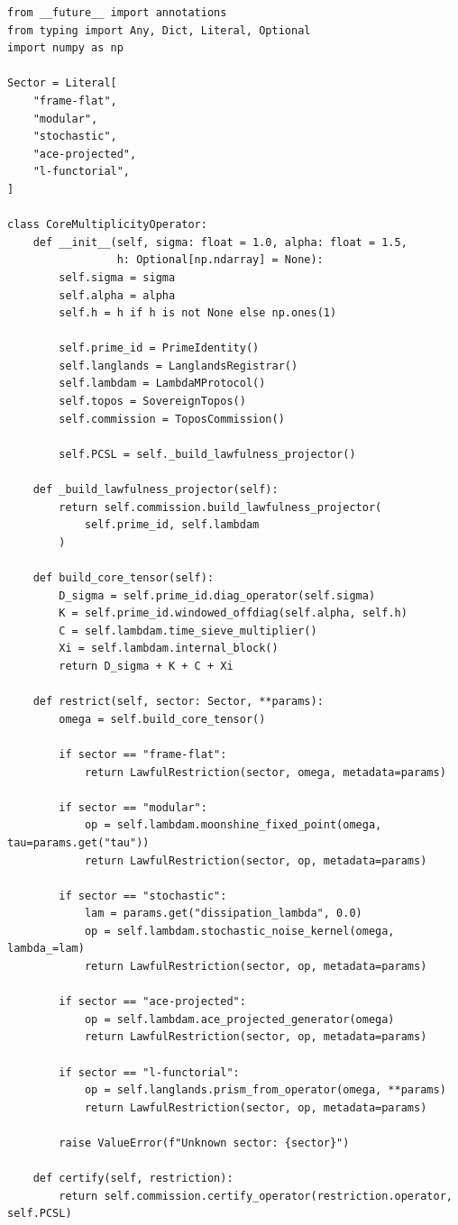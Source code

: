 \documentclass[11pt]{article}
\theoremstyle{plain}
\theoremstyle{definition}
\theoremstyle{remark}
\begin{document}
\begin{lstlisting}[style=pythonstyle,caption={Core Multiplicity Operator skeleton}]
from __future__ import annotations
from typing import Any, Dict, Literal, Optional
import numpy as np

Sector = Literal[
    "frame-flat",
    "modular",
    "stochastic",
    "ace-projected",
    "l-functorial",
]

class CoreMultiplicityOperator:
    def __init__(self, sigma: float = 1.0, alpha: float = 1.5,
                 h: Optional[np.ndarray] = None):
        self.sigma = sigma
        self.alpha = alpha
        self.h = h if h is not None else np.ones(1)

        self.prime_id = PrimeIdentity()
        self.langlands = LanglandsRegistrar()
        self.lambdam = LambdaMProtocol()
        self.topos = SovereignTopos()
        self.commission = ToposCommission()

        self.PCSL = self._build_lawfulness_projector()

    def _build_lawfulness_projector(self):
        return self.commission.build_lawfulness_projector(
            self.prime_id, self.lambdam
        )

    def build_core_tensor(self):
        D_sigma = self.prime_id.diag_operator(self.sigma)
        K = self.prime_id.windowed_offdiag(self.alpha, self.h)
        C = self.lambdam.time_sieve_multiplier()
        Xi = self.lambdam.internal_block()
        return D_sigma + K + C + Xi

    def restrict(self, sector: Sector, **params):
        omega = self.build_core_tensor()

        if sector == "frame-flat":
            return LawfulRestriction(sector, omega, metadata=params)

        if sector == "modular":
            op = self.lambdam.moonshine_fixed_point(omega, tau=params.get("tau"))
            return LawfulRestriction(sector, op, metadata=params)

        if sector == "stochastic":
            lam = params.get("dissipation_lambda", 0.0)
            op = self.lambdam.stochastic_noise_kernel(omega, lambda_=lam)
            return LawfulRestriction(sector, op, metadata=params)

        if sector == "ace-projected":
            op = self.lambdam.ace_projected_generator(omega)
            return LawfulRestriction(sector, op, metadata=params)

        if sector == "l-functorial":
            op = self.langlands.prism_from_operator(omega, **params)
            return LawfulRestriction(sector, op, metadata=params)

        raise ValueError(f"Unknown sector: {sector}")

    def certify(self, restriction):
        return self.commission.certify_operator(restriction.operator, self.PCSL)
\end{lstlisting}
\end{document}
